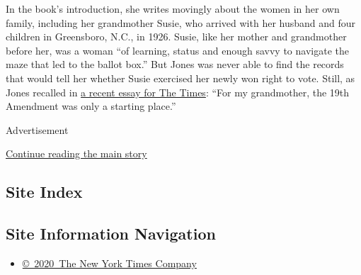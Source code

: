 In the book's introduction, she writes movingly about the women in her
own family, including her grandmother Susie, who arrived with her
husband and four children in Greensboro, N.C., in 1926. Susie, like her
mother and grandmother before her, was a woman ``of learning, status and
enough savvy to navigate the maze that led to the ballot box.'' But
Jones was never able to find the records that would tell her whether
Susie exercised her newly won right to vote. Still, as Jones recalled in
\href{https://www.nytimes3xbfgragh.onion/2020/08/14/us/suffrage-segregation-voting-black-women-19th-amendment.html}{a
recent essay for The Times}: ``For my grandmother, the 19th Amendment
was only a starting place.''

Advertisement

\protect\hyperlink{after-bottom}{Continue reading the main story}

\hypertarget{site-index}{%
\subsection{Site Index}\label{site-index}}

\hypertarget{site-information-navigation}{%
\subsection{Site Information
Navigation}\label{site-information-navigation}}

\begin{itemize}
\tightlist
\item
  \href{https://help.nytimes3xbfgragh.onion/hc/en-us/articles/115014792127-Copyright-notice}{©~2020~The
  New York Times Company}
\end{itemize}

